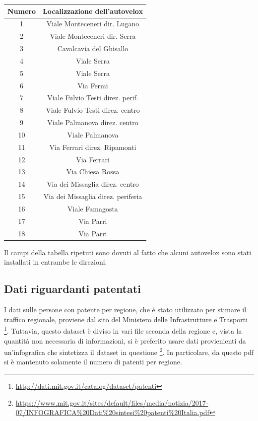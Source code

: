 \documentclass[a4paper]{report}
\begin{document}
\begin{center}
    \def\arraystretch{1.5}%
    \begin{tabular}{ |c|c| } 
    \hline
    Numero & Localizzazione dell'autovelox \\ 
    \hline
    \rowcolor{TableGray}
    1   &   Viale Monteceneri  dir. Lugano\\
    2   &   Viale Monteceneri dir. Serra\\
    \rowcolor{TableGray}
    3   &   Cavalcavia del Ghisallo\\
    4   &   Viale Serra \\
    \rowcolor{TableGray}
    5   &   Viale Serra\\
    6   &   Via Fermi\\
    \rowcolor{TableGray}
    7   &   Viale Fulvio Testi direz. perif.\\
    8   &   Viale Fulvio Testi direz. centro\\
    \rowcolor{TableGray}
    9   &   Viale Palmanova  direz. centro\\
    10  &   Viale Palmanova\\
    \rowcolor{TableGray}
    11  &   Via Ferrari direz. Ripamonti\\
    12  &   Via Ferrari\\
    \rowcolor{TableGray}
    13  &   Via Chiesa Rossa\\
    14  &   Via dei Missaglia direz. centro\\
    \rowcolor{TableGray}
    15  &   Via dei Missaglia direz. periferia\\
    16  &   Viale Famagosta\\
    \rowcolor{TableGray}
    17  &   Via Parri\\
    18  &   Via Parri\\
    \hline
    \end{tabular}
    \label{ztl-milano}
\end{center}

Il campi della tabella ripetuti sono dovuti al fatto che alcuni autovelox sono stati installati in entrambe le direzioni.

\subsection{Dati riguardanti patentati}
I dati sulle persone con patente per regione, che è stato utilizzato per stimare il traffico 
regionale, proviene dal sito del Ministero delle Infrastrutture e Trasporti 
\footnote{\url{http://dati.mit.gov.it/catalog/dataset/patenti}}.
Tuttavia, questo dataset è diviso in vari file seconda della regione e, vista la quantità 
non necessaria di informazioni, si è preferito usare dati provienienti da un'infografica che 
sintetizza il dataset in questione
\footnote{\url{https://www.mit.gov.it/sites/default/files/media/notizia/2017-07/INFOGRAFICA\%20Dati\%20sintesi\%20patenti\%20Italia.pdf}}.
In particolare, da questo pdf si è mantenuto solamente il numero di patenti per regione.
\end{document}
